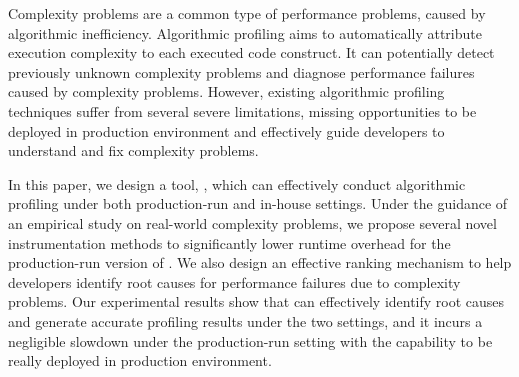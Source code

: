 Complexity problems are a common type of performance problems, 
caused by algorithmic inefficiency. 
Algorithmic profiling aims to automatically attribute execution 
complexity to each executed code construct.
It can potentially detect previously unknown complexity problems 
and diagnose performance failures caused by complexity problems. 
However, existing algorithmic profiling techniques 
suffer from several severe limitations, 
missing opportunities to be deployed in production environment
and effectively guide developers 
to understand and fix complexity problems. 

In this paper, we design a tool, \Tool, which can effectively conduct 
algorithmic profiling under both production-run and in-house settings.
Under the guidance of an empirical study on real-world complexity problems, 
we propose several novel instrumentation methods to 
significantly lower runtime overhead
for the production-run version of \Tool.
We also design an effective ranking mechanism to help developers identify 
root causes for performance failures due to complexity problems. 
Our experimental results show that \Tool 
can effectively identify root causes and generate 
accurate profiling results under the two settings, 
and it incurs a negligible slowdown under the production-run setting
with the capability to be really deployed in production environment. 






